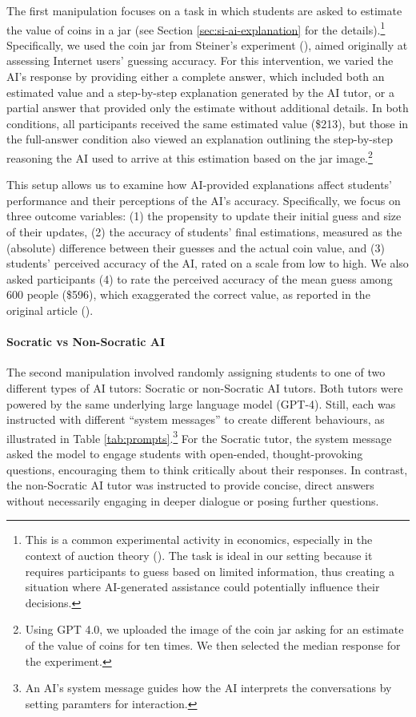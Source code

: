\documentclass[
  11pt,
]{article}
\begin{document}
The first manipulation focuses on a task in which students are asked to estimate the value of coins in a jar (see Section \ref{sec:si-ai-explanation} for the details).\footnote{This is a common experimental activity in economics, especially in the context of auction theory (). The task is ideal in our setting because it requires participants to guess based on limited information, thus creating a situation where AI-generated assistance could potentially influence their decisions.} Specifically, we used the coin jar from Steiner's experiment (), aimed originally at assessing Internet users' guessing accuracy. For this intervention, we varied the AI's response by providing either a complete answer, which included both an estimated value and a step-by-step explanation generated by the AI tutor, or a partial answer that provided only the estimate without additional details. In both conditions, all participants received the same estimated value (\$213), but those in the full-answer condition also viewed an explanation outlining the step-by-step reasoning the AI used to arrive at this estimation based on the jar image.\footnote{Using GPT 4.0, we uploaded the image of the coin jar asking for an estimate of the value of coins for ten times. We then selected the median response for the experiment.}

This setup allows us to examine how AI-provided explanations affect students' performance and their perceptions of the AI's accuracy. Specifically, we focus on three outcome variables: (1) the propensity to update their initial guess and size of their updates, (2) the accuracy of students' final estimations, measured as the (absolute) difference between their guesses and the actual coin value, and (3) students' perceived accuracy of the AI, rated on a scale from low to high. We also asked participants (4) to rate the perceived accuracy of the mean guess among 600 people (\$596), which exaggerated the correct value, as reported in the original article ().

\paragraph*{Socratic vs Non-Socratic AI}\label{socratic-vs-non-socratic-ai}

The second manipulation involved randomly assigning students to one of two different types of AI tutors: Socratic or non-Socratic AI tutors. Both tutors were powered by the same underlying large language model (GPT-4). Still, each was instructed with different ``system messages'' to create different behaviours, as illustrated in Table \ref{tab:prompts}.\footnote{An AI's system message guides how the AI interprets the conversations by setting paramters for interaction.} For the Socratic tutor, the system message asked the model to engage students with open-ended, thought-provoking questions, encouraging them to think critically about their responses. In contrast, the non-Socratic AI tutor was instructed to provide concise, direct answers without necessarily engaging in deeper dialogue or posing further questions.
\end{document}
